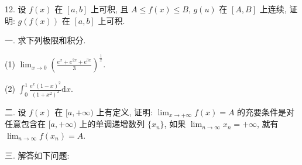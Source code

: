 \documentclass{examcollection}
\begin{document}
{\begin{minipage}{\textwidth}
12. 设 $f(x)$ 在 $[a, b]$ 上可积, 且 $A \leq f(x) \leq B$, $g(u)$ 在 $[A, B]$ 上连续, 证明: $g(f(x))$ 在 $[a, b]$ 上可积.\par
{}\smallskip
一. 求下列极限和积分.\par
(1) $\lim_{x\to 0}\left(\frac{e^x + e^{2x} + e^{3x}}{3}\right)^{\frac{1}{x}}.$\par
(2) $\int_0^1\frac{e^x(1 - x)^2}{(1 + x^2)^2}\mathrm{d}x.$\par
二. 设 $f(x)$ 在 $[a, +\infty)$ 上有定义, 证明: $\lim_{x \to +\infty} f(x) = A$ 的充要条件是对任意包含在 $[a, +\infty)$ 上的单调递增数列 $\{x_n\}$, 如果 $\lim_{n \to \infty} x_n = +\infty$, 就有 $\lim_{n \to \infty} f(x_n) = A$.\par
三. 解答如下问题:\par
\end{minipage}}
\ifdim\dimexpr\ht\proofbox+\dp\proofbox\relax>\textheight
\noindent\resizebox{!}{\textheight}{\usebox{\proofbox}}\else\noindent\usebox{\proofbox}\fi\clearpage
\end{document}
